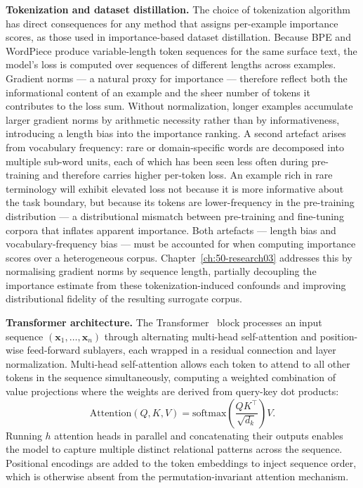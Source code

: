 \begin{foldable}
  \textbf{Tokenization and dataset distillation.}
  The choice of tokenization algorithm has direct consequences for any method that assigns per-example importance scores, as those used in importance-based dataset distillation.
  Because \ac{BPE} and WordPiece produce variable-length token sequences for the same surface text, the model's loss is computed over sequences of different lengths across examples.
  Gradient norms --- a natural proxy for importance --- therefore reflect both the informational content of an example and the sheer number of tokens it contributes to the loss sum.
  Without normalization, longer examples accumulate larger gradient norms by arithmetic necessity rather than by informativeness, introducing a length bias into the importance ranking.
  A second artefact arises from vocabulary frequency: rare or domain-specific words are decomposed into multiple sub-word units, each of which has been seen less often during pre-training and therefore carries higher per-token loss.
  An example rich in rare terminology will exhibit elevated loss not because it is more informative about the task boundary, but because its tokens are lower-frequency in the pre-training distribution --- a distributional mismatch between pre-training and fine-tuning corpora that inflates apparent importance.
  Both artefacts --- length bias and vocabulary-frequency bias --- must be accounted for when computing importance scores over a heterogeneous corpus.
  Chapter~\ref{ch:50-research03} addresses this by normalising gradient norms by sequence length, partially decoupling the importance estimate from these tokenization-induced confounds and improving distributional fidelity of the resulting surrogate corpus.
\end{foldable}

\begin{foldable}
  \textbf{Transformer architecture.}
  The Transformer~\cite{vaswani2017attention} block processes an input sequence $(\mathbf{x}_1, \ldots, \mathbf{x}_n)$ through alternating multi-head self-attention and position-wise feed-forward sublayers, each wrapped in a residual connection and layer normalization.
  Multi-head self-attention allows each token to attend to all other tokens in the sequence simultaneously, computing a weighted combination of value projections where the weights are derived from query-key dot products:
  \begin{equation}
    \text{Attention}(Q, K, V) = \text{softmax}\!\left(\frac{QK^\top}{\sqrt{d_k}}\right)V.
    \label{eq:attention}
  \end{equation}
  Running $h$ attention heads in parallel and concatenating their outputs enables the model to capture multiple distinct relational patterns across the sequence.
  Positional encodings are added to the token embeddings to inject sequence order, which is otherwise absent from the permutation-invariant attention mechanism.
\end{foldable}

